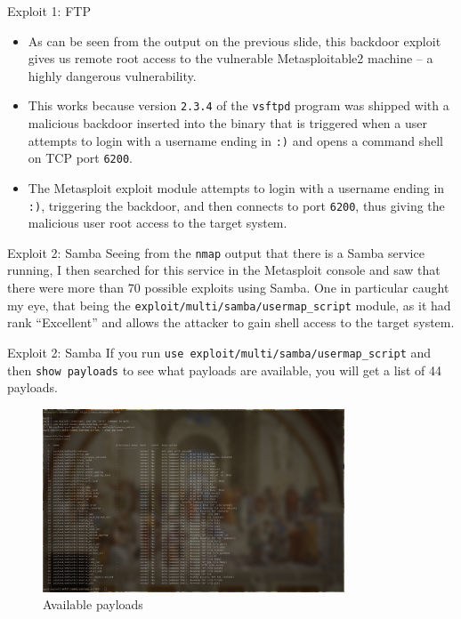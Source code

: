 \documentclass[]{beamer}
\begin{document}
\begin{frame}{Exploit 1: FTP}
    \begin{itemize}
        \item   As can be seen from the output on the previous slide, this backdoor exploit gives us remote root access to the vulnerable Metasploitable2 machine -- a highly dangerous vulnerability.
        \item   This works because version \texttt{2.3.4} of the \texttt{vsftpd} program was shipped with a malicious backdoor inserted into the binary that is triggered when a user attempts to login with a username ending in \texttt{:)} and opens a command shell on TCP port \texttt{6200}.
        \item   The Metasploit exploit module attempts to login with a username ending in \texttt{:)}, triggering the backdoor, and then connects to port \texttt{6200}, thus giving the malicious user root access to the target system.
    \end{itemize}
\end{frame}

\begin{frame}{Exploit 2: Samba}
    Seeing from the \texttt{nmap} output that there is a Samba service running, I then searched for this service in the Metasploit console and saw that there were more than 70 possible exploits using Samba.
    One in particular caught my eye, that being the \texttt{exploit/multi/samba/usermap\_script} module, as it had rank ``Excellent'' and allows the attacker to gain shell access to the target system.
\end{frame}

\begin{frame}{Exploit 2: Samba}
    If you run \texttt{use exploit/multi/samba/usermap\_script} and then \texttt{show payloads} to see what payloads are available, 
    you will get a list of 44 payloads.

\begin{figure}[H]
    \centering
    \includegraphics[width=0.8\textwidth]{./images/sambapayloads.png}
    \caption{Available payloads}
\end{figure}

\end{frame}
\end{document}
